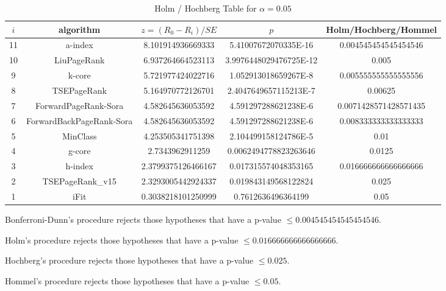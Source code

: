 \documentclass[a4paper,10pt]{article}
\begin{document}
\begin{landscape}
\begin{table}[!htp]
\centering\tiny
\caption{Holm / Hochberg Table for $\alpha=0.05$}
\begin{tabular}{ccccc}
$i$&algorithm&$z=(R_0 - R_i)/SE$&$p$&Holm/Hochberg/Hommel\\
\hline
11&a-index&8.101914936669333&5.41007672070335E-16&0.004545454545454546\\
10&LiuPageRank&6.937264664523113&3.9976448029476725E-12&0.005\\
9&k-core&5.721977424022716&1.052913018659267E-8&0.005555555555555556\\
8&TSEPageRank&5.164970772126701&2.4047649657115213E-7&0.00625\\
7&ForwardPageRank-Sora&4.582645636053592&4.591297288621238E-6&0.0071428571428571435\\
6&ForwardBackPageRank-Sora&4.582645636053592&4.591297288621238E-6&0.008333333333333333\\
5&MinClass&4.253505341751398&2.104499158124786E-5&0.01\\
4&g-core&2.7343962911259&0.0062494778823263646&0.0125\\
3&h-index&2.3799375126466167&0.017315574048353165&0.016666666666666666\\
2&TSEPageRank_v15&2.3293005442924337&0.019843149568122824&0.025\\
1&iFit&0.3038218101250999&0.7612636496364199&0.05\\
\hline
\end{tabular}
\end{table}
Bonferroni-Dunn's procedure rejects those hypotheses that have a p-value $\le0.004545454545454546$.


Holm's procedure rejects those hypotheses that have a p-value $\le0.016666666666666666$.


Hochberg's procedure rejects those hypotheses that have a p-value $\le0.025$.


Hommel's procedure rejects those hypotheses that have a p-value $\le0.05$.



\end{landscape}
\end{document}
